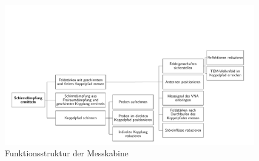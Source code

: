 \begin{figure}[ht]
    \centering
    \includegraphics[page = 1, width=\textwidth, trim = 0.8cm 0.5cm 1.3cm 5.5cm, clip]{Abbildungen/Kapitel3/Funktionsstruktur.pdf}
    \caption{Funktionsstruktur der Messkabine}
    \label{fig:3_Funktionsstruktur}
\end{figure}


